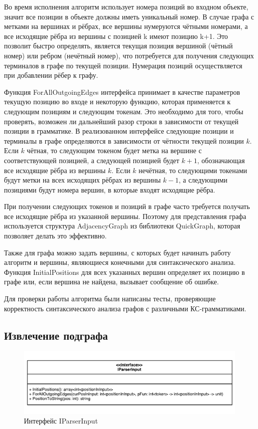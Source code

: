 \documentclass[14pt]{matmex-diploma}
\begin{document}
Во время исполнения алгоритм использует номера позиций во входном объекте, значит все позиции в объекте должны иметь уникальный номер. В случае графа с метками на вершинах и рёбрах, все вершины нумеруются чётными номерами, а все исходящие рёбра из вершины с позицией k имеют позицию k+1. Это позволит быстро определять, является текущая позиция вершиной (чётный номер) или ребром (нечётный номер), что потребуется для получения следующих терминалов в графе по текущей позиции. Нумерация позиций осуществляется при добавлении рёбер к графу.

Функция ForAllOutgoingEdges интерфейса принимает в качестве параметров текущую позицию во входе и некоторую функцию, которая применяется к следующим позициям и следующим токенам. Это необходимо для того, чтобы проверять, возможен ли дальнейший разор строки в зависимости от текущей позиции в грамматике. В реализованном интерфейсе следующие позиции и терминалы в графе определяются в зависимости от чётности текущей позиции $k$. Если $k$ чётная, то следующим токеном будет метка на вершине с соответствующей позицией, а следующей позицией будет $k+1$, обозначающая все исходящие рёбра из вершины $k$. Если $k$ нечётная, то следующими токенами будут метки на всех исходящих рёбрах из вершины $k-1$, а следующими позициями будут номера вершин, в которые входят исходящие рёбра.

При получении следующих токенов и позиций в графе часто требуется получать все исходящие рёбра из указанной вершины. Поэтому для представления графа используется структура AdjacencyGraph из библиотеки QuickGraph, которая позволяет делать это эффективно.

Также для графа можно задать вершины, с которых будет начинать работу алгоритм и вершины, являющиеся конечными для синтаксического анализа. Функция InitialPositions для всех указанных вершин определяет их позицию в графе или, если вершина не найдена, вызывает сообщение об ошибке.

Для проверки работы алгоритма были написаны тесты, проверяющие корректность синтаксического анализа графов с различными КС-грамматиками.

\subsection{Извлечение подграфа}

\begin{figure}
\centering
\includegraphics[width=16cm]{images/IParserInput.pdf}
\caption{Интерфейс IParserInput}
\label{interface}
\end{figure}
\end{document}

